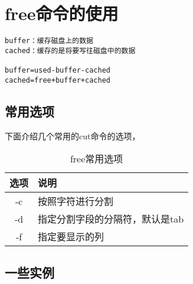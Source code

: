 \section{free命令的使用}
\label{sec:freeCmd}

\begin{verbatim}
buffer：缓存磁盘上的数据
cached：缓存的是将要写往磁盘中的数据

buffer=used-buffer-cached
cached=free+buffer+cached
\end{verbatim}

\subsection{常用选项}
\label{subsec:freeOptions}

下面介绍几个常用的cut命令的选项，

\begin{table}[htbp]
  \centering
    \caption{free常用选项}
    \label{tab:freeSomeOpts}
    \begin{tabular}{cl}
      \toprule
      选项     & 说明 \\
      \midrule
      -c        & 按照字符进行分割 \\
      -d        & 指定分割字段的分隔符，默认是tab \\
      -f        & 指定要显示的列 \\
      \bottomrule
    \end{tabular}
\end{table}

\subsection{一些实例}
\label{subsec:freeInstances}